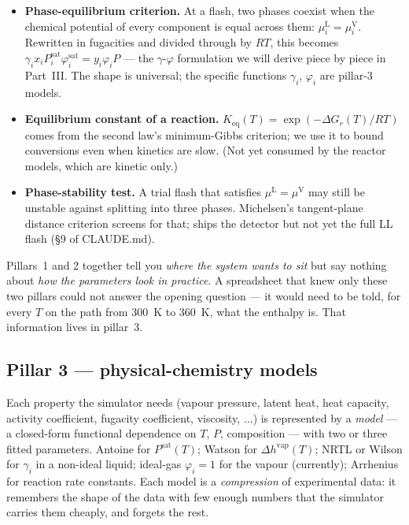\documentclass[11pt,a4paper]{article}
\begin{document}
\begin{itemize}[leftmargin=*,nosep]
  \item \textbf{Phase-equilibrium criterion.}  At a flash, two
        phases coexist when the chemical potential of every
        component is equal across them: $\mu_i^{\mathrm{L}} =
        \mu_i^{\mathrm{V}}$.  Rewritten in fugacities and divided
        through by $RT$, this becomes
        $\gamma_i x_i P^{\mathrm{sat}}_i \varphi_i^{\mathrm{sat}} =
        y_i \varphi_i P$ --- the $\gamma$-$\varphi$ formulation we
        will derive piece by piece in Part~III.  The shape is
        universal; the specific functions $\gamma_i$,
        $\varphi_i$ are pillar-3 models.
  \item \textbf{Equilibrium constant of a reaction.}
        $K_{\mathrm{eq}}(T) = \exp(-\Delta G_r(T) / RT)$ comes from
        the second law's minimum-Gibbs criterion; we use it to
        bound conversions even when kinetics are slow.  (Not yet
        consumed by the reactor models, which are kinetic only.)
  \item \textbf{Phase-stability test.}  A trial flash that satisfies
        $\mu^{\mathrm{L}} = \mu^{\mathrm{V}}$ may still be unstable
        against splitting into three phases.  Michelsen's tangent-plane
        distance criterion screens for that; ships the detector
        but not yet the full LL flash (§9 of CLAUDE.md).
\end{itemize}

\begin{intuition}
Pillars~1 and 2 together tell you \emph{where the system wants to
sit} but say nothing about \emph{how the parameters look in
practice}.  A spreadsheet that knew only these two pillars could
not answer the opening question --- it would need to be told, for
every $T$ on the path from 300~K to 360~K, what the enthalpy is.
That information lives in pillar~3.
\end{intuition}

\subsection{Pillar 3 --- physical-chemistry models}

Each property the simulator needs (vapour pressure, latent heat,
heat capacity, activity coefficient, fugacity coefficient, viscosity,
$\ldots$) is represented by a \emph{model} --- a closed-form
functional dependence on $T$, $P$, composition --- with two or
three fitted parameters.  Antoine for $P^{\mathrm{sat}}(T)$; Watson
for $\Delta h^{\mathrm{vap}}(T)$; NRTL or Wilson for $\gamma_i$ in
a non-ideal liquid; ideal-gas $\varphi_i = 1$ for the vapour
(currently); Arrhenius for reaction rate constants.  Each model is a
\emph{compression} of experimental data: it remembers the shape of
the data with few enough numbers that the simulator carries them
cheaply, and forgets the rest.
\end{document}
